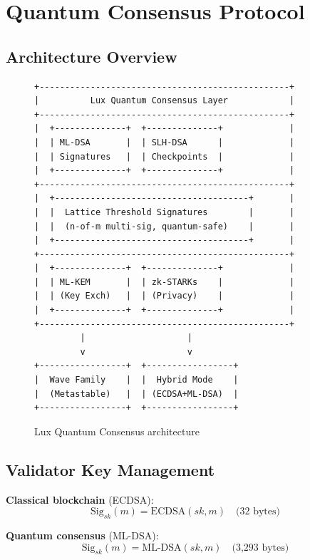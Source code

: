 \section{Quantum Consensus Protocol}


\subsection{Architecture Overview}

\begin{figure}[h]
\centering
\begin{verbatim}
+-------------------------------------------------+
|          Lux Quantum Consensus Layer            |
+-------------------------------------------------+
|  +--------------+  +--------------+             |
|  | ML-DSA       |  | SLH-DSA      |             |
|  | Signatures   |  | Checkpoints  |             |
|  +--------------+  +--------------+             |
+-------------------------------------------------+
|  +--------------------------------------+       |
|  |  Lattice Threshold Signatures        |       |
|  |  (n-of-m multi-sig, quantum-safe)    |       |
|  +--------------------------------------+       |
+-------------------------------------------------+
|  +--------------+  +--------------+             |
|  | ML-KEM       |  | zk-STARKs    |             |
|  | (Key Exch)   |  | (Privacy)    |             |
|  +--------------+  +--------------+             |
+-------------------------------------------------+
         |                    |
         v                    v
+-----------------+  +-----------------+
|  Wave Family    |  |  Hybrid Mode    |
|  (Metastable)   |  | (ECDSA+ML-DSA)  |
+-----------------+  +-----------------+
\end{verbatim}
\caption{Lux Quantum Consensus architecture}
\end{figure}

\subsection{Validator Key Management}

\textbf{Classical blockchain} (ECDSA):
\begin{equation}
\text{Sig}_{sk}(m) = \text{ECDSA}(sk, m) \quad \text{(32 bytes)}
\end{equation}

\textbf{Quantum consensus} (ML-DSA):
\begin{equation}
\text{Sig}_{sk}(m) = \text{ML-DSA}(sk, m) \quad \text{(3,293 bytes)}
\end{equation}

